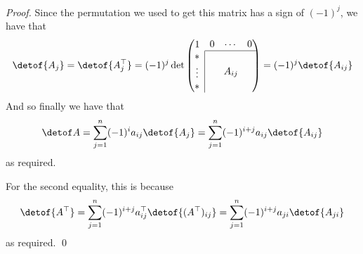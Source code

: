 \begin{proof}
    Since the permutation we used to get this matrix has a sign of $(-1)^j$, we have that
    \[ \detof{A_j} = \detof{A_{j}^\top} = (-1)^j\det\pmat{
    1 & \begin{matrix}0 & \cdots & 0\\\hline\end{matrix} \\
    \begin{matrix}*\\\vdots\\ *\end{matrix}\hspace\arraycolsep\vline\hspace{-\arraycolsep}& A_{ij}} = (-1)^j\detof{A_{ij}} \]
    And so finally we have that
    \[ \detof A = \sum_{j=1}^n(-1)^ia_{ij}\detof{A_j} = \sum_{j=1}^n(-1)^{i+j}a_{ij}\detof{A_{ij}} \]
    as required.

    For the second equality, this is because
    \[ \detof{A^\top} = \sum_{j=1}^n (-1)^{i+j}a^\top_{ij}\detof{(A^\top)_{ij}} = \sum_{j=1}^n (-1)^{i+j}a_{ji}\detof{A_{ji}} \]
    as required.
    \qed

\end{proof}


